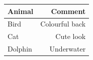 \begin{example}
{\begin{gridlayout}{\textwidth}{11cm}
\begin{row}{0.3}
\begin{cell}{0.3}
\begin{tabular}{lr}
                    \toprule
                    Animal & Comment \\
                    \midrule
                    Bird & Colourful back \\
                    Cat & Cute look \\
                    Dolphin & Underwater \\
                    \bottomrule
                \end{tabular}
            \end{cell}
        \end{row}
    \end{gridlayout}
    }
\end{example}